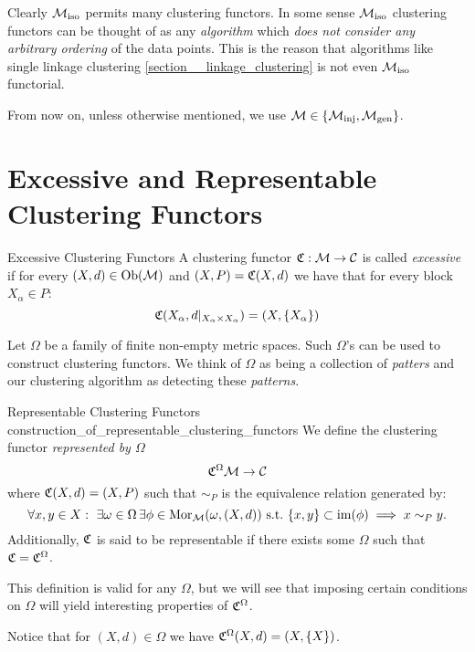 Clearly ${\mathcal{M}_\mathrm{iso}}$ permits many clustering functors.
In some sense ${\mathcal{M}_\mathrm{iso}}$ clustering functors can be thought of as any \emph{algorithm} which \emph{does not consider any arbitrary ordering} of the data points.
This is the reason that algorithms like single linkage clustering \ref{section__linkage_clustering} is not even ${\mathcal{M}_\mathrm{iso}}$ functorial.

From now on, unless otherwise mentioned, we use $\mathcal{M} \in \{{\mathcal{M}_\mathrm{inj}}, {\mathcal{M}_\mathrm{gen}}\}$.

\section{Excessive and Representable Clustering Functors}
\begin{definition}{Excessive Clustering Functors \cite{Carlsson2010}}{}
A clustering functor $\mathfrak{C}: \mathcal{M} \to \mathcal{C}$ is called \emph{excessive} if for every $(X,d) \in \mathrm {Ob}(\mathcal{M})$ and $(X,P) = \mathfrak{C}(X,d)$ we have that for every block $X_\alpha \in P$:
$$
\mathfrak{C}(X_\alpha, d|_{X_\alpha \times X_\alpha}) = (X, \{X_\alpha\})
$$
\end{definition}

Let $\Omega$ be a family of finite non-empty metric spaces. Such $\Omega$'s can be used to construct clustering functors. We think of $\Omega$ as being a collection of \emph{patters} and our clustering algorithm as detecting these \emph{patterns}.



\begin{definition}{Representable Clustering Functors \cite{Carlsson2010}}{construction_of_representable_clustering_functors}
We define the clustering functor \emph{represented by $\Omega$}
$$
\mathfrak{C}^\Omega \mathcal{M} \to \mathcal{C}
$$
where $\mathfrak{C}(X,d) = (X, P)$ such that $\sim_P$ 
is the equivalence relation generated by:
\begin{equation*}
    \forall x,y \in X: \ \exists \omega \in \Omega \,\exists \phi \in \mathrm {Mor}_{\mathcal{M}}(\omega, (X,d)) \ \text{s.t.} \ \{x,y\} \subset \operatorname*{im}(\phi) \implies x \sim_P y.
\end{equation*}
Additionally, $\mathfrak{C}$ is said to be representable if there exists some $\Omega$ such that $\mathfrak{C} = \mathfrak{C}^\Omega$.
\end{definition}

This definition is valid for any $\Omega$, but we will see that imposing certain conditions on $\Omega$ will yield interesting properties of $\mathfrak{C}^\Omega$.

\begin{myremark}{}{}
Notice that for $(X,d) \in \Omega$ we have $\mathfrak{C}^\Omega(X,d) = (X, \{X\})$.
\end{myremark}


